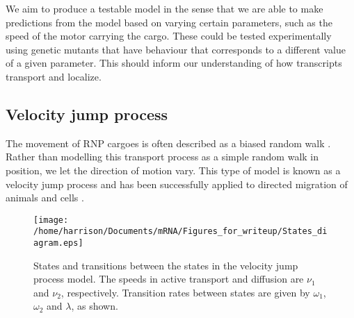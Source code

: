 \documentclass[twocolumn]{biophys}
\begin{document}
We aim to produce a testable model in the sense that we are able to make predictions from the model based on varying certain parameters, such as the speed of the motor carrying the cargo. These could be tested experimentally using genetic mutants that have behaviour that corresponds to a different value of a given parameter. 
This should inform our understanding of how transcripts transport and localize.

\subsection{Velocity jump process} \label{VJ model}
The movement of RNP cargoes is often described as a biased random walk \citep{zimyanin2008vivo}.
Rather than modelling this transport process as a simple random walk in position, we let the direction of motion vary. 
This type of model is known as a velocity jump process and has been successfully applied to directed migration of animals and cells \citep{codling2005calculating, taylorking2015birds}.

\begin{figure}[h]
 \centering
 \texttt{[image: /home/harrison/Documents/mRNA/Figures\_for\_writeup/States\_diagram.eps]}
 \caption{\small States and transitions between the states in the velocity jump process model. The speeds in active transport and diffusion are $\nu_1$ and $\nu_2$, respectively. Transition rates between states are given by $\omega_1$, $\omega_2$ and $\lambda$, as shown.}
 \label{FIG:Phases_of_motion}
\end{figure}
\end{document}
